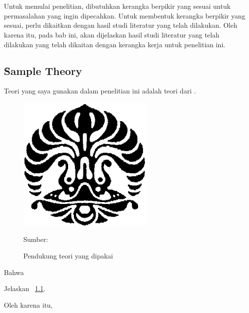 \chapter{\babDua}
Untuk memulai penelitian, dibutuhkan kerangka berpikir yang sesuai untuk permasalahan yang ingin dipecahkan. Untuk membentuk kerangka berpikir yang sesuai, perlu dikaitkan dengan hasil studi literatur yang telah dilakukan. Oleh karena itu, pada bab ini, akan dijelaskan hasil studi literatur yang telah dilakukan yang telah dikaitan dengan kerangka kerja untuk penelitian ini.


\section{\f{Sample Theory}}
Teori yang saya gunakan dalam penelitian ini adalah teori dari \textcite{Williams2002organizational}.

\begin{figure}
	\centering
	\caption{Pendukung teori yang dipakai}
	\includegraphics[width=0.6\textwidth]{assets/pics/makara.png}\\
	{\footnotesize Sumber: \textcite{Sugiyono2008}\par}
	\label{fig:sample}
\end{figure}

Bahwa \lipsum[34]

Jelaskan \pic~\ref{fig:sample}.

Oleh karena itu, \lipsum[35-37]

